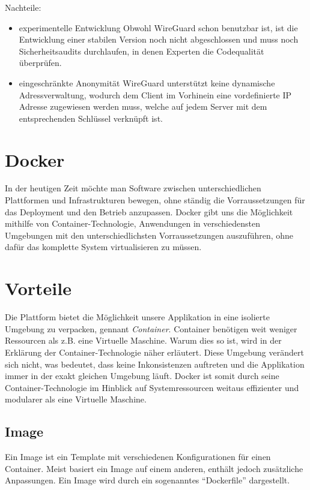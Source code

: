 Nachteile:
\begin{itemize}
    \item experimentelle Entwicklung \newline
    Obwohl WireGuard schon benutzbar ist, ist die Entwicklung einer stabilen Version noch nicht abgeschlossen und muss noch Sicherheitsaudits durchlaufen, in denen Experten die Codequalität überprüfen.
    \item eingeschränkte Anonymität \newline
    WireGuard unterstützt keine dynamische Adressverwaltung, wodurch dem Client im Vorhinein eine vordefinierte IP Adresse zugewiesen werden muss, welche auf jedem Server mit dem entsprechenden Schlüssel verknüpft ist.
\end{itemize}
\newpage
\section{Docker}
In der heutigen Zeit möchte man Software zwischen unterschiedlichen Plattformen und
Infrastrukturen bewegen, ohne ständig die Vorraussetzungen für das Deployment und den Betrieb
anzupassen.\newline
Docker gibt uns die Möglichkeit mithilfe von Container-Technologie, Anwendungen in
verschiedensten Umgebungen mit den unterschiedlichsten Vorraussetzungen auszuführen, ohne
dafür das komplette System virtualisieren zu müssen.
\section{Vorteile}
Die Plattform bietet die Möglichkeit unsere Applikation in eine isolierte Umgebung zu verpacken,
gennant \textit{Container}. Container benötigen weit weniger Ressourcen als z.B. eine Virtuelle
Maschine. Warum dies so ist, wird in der Erklärung der Container-Technologie näher erläutert.
Diese Umgebung verändert sich nicht, was bedeutet, dass keine Inkonsistenzen auftreten und die
Applikation immer in der exakt gleichen Umgebung läuft.
Docker ist somit durch seine Container-Technologie im Hinblick auf Systemressourcen weitaus
effizienter und modularer als eine Virtuelle Maschine.
\subsection{Image}
Ein Image ist ein Template mit verschiedenen Konfigurationen für einen Container. Meist basiert
ein Image auf einem anderen, enthält jedoch zusätzliche Anpassungen.
Ein Image wird durch ein sogenanntes “Dockerfile” dargestellt.
